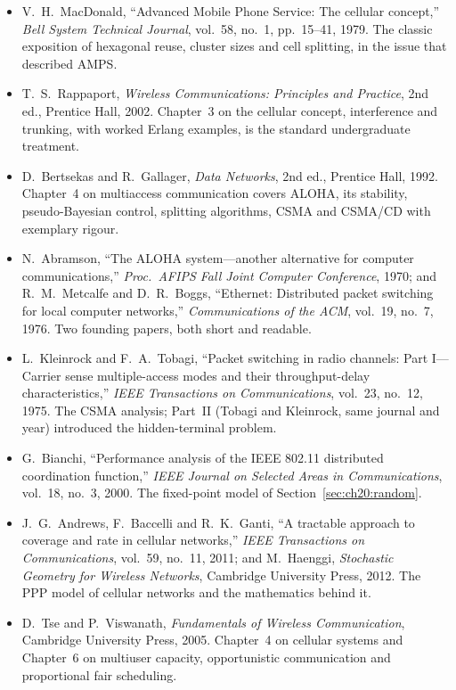 \furtherreading
\begin{itemize}
\item V.~H.~MacDonald, ``Advanced Mobile Phone Service: The cellular concept,'' \emph{Bell System Technical Journal}, vol.~58,
no.~1, pp.~15--41, 1979. The classic exposition of hexagonal reuse, cluster sizes and cell splitting, in the issue that described
AMPS.
\item T.~S.~Rappaport, \emph{Wireless Communications: Principles and Practice}, 2nd ed., Prentice Hall, 2002. Chapter~3 on the
cellular concept, interference and trunking, with worked Erlang examples, is the standard undergraduate treatment.
\item D.~Bertsekas and R.~Gallager, \emph{Data Networks}, 2nd ed., Prentice Hall, 1992. Chapter~4 on multiaccess communication
covers ALOHA, its stability, pseudo-Bayesian control, splitting algorithms, CSMA and CSMA/CD with exemplary rigour.
\item N.~Abramson, ``The ALOHA system---another alternative for computer communications,'' \emph{Proc.\ AFIPS Fall Joint
Computer Conference}, 1970; and R.~M.~Metcalfe and D.~R.~Boggs, ``Ethernet: Distributed packet switching for local computer
networks,'' \emph{Communications of the ACM}, vol.~19, no.~7, 1976. Two founding papers, both short and readable.
\item L.~Kleinrock and F.~A.~Tobagi, ``Packet switching in radio channels: Part I---Carrier sense multiple-access modes and
their throughput-delay characteristics,'' \emph{IEEE Transactions on Communications}, vol.~23, no.~12, 1975. The CSMA analysis; Part~II
(Tobagi and Kleinrock, same journal and year) introduced the hidden-terminal problem.
\item G.~Bianchi, ``Performance analysis of the IEEE 802.11 distributed coordination function,'' \emph{IEEE Journal on Selected
Areas in Communications}, vol.~18, no.~3, 2000. The fixed-point model of Section~\ref{sec:ch20:random}.
\item J.~G.~Andrews, F.~Baccelli and R.~K.~Ganti, ``A tractable approach to coverage and rate in cellular networks,'' \emph{IEEE
Transactions on Communications}, vol.~59, no.~11, 2011; and M.~Haenggi, \emph{Stochastic Geometry for Wireless Networks},
Cambridge University Press, 2012. The PPP model of cellular networks and the mathematics behind it.
\item D.~Tse and P.~Viswanath, \emph{Fundamentals of Wireless Communication}, Cambridge University Press, 2005. Chapter~4 on
cellular systems and Chapter~6 on multiuser capacity, opportunistic communication and proportional fair scheduling.

\end{itemize}
